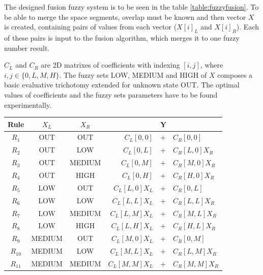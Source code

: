 The designed fusion fuzzy system is to be seen in the table \ref{table:fuzzyfusion}. To be able to merge
the space segments, overlap must be known and then vector $X$ is created, containing pairs of values
from each vector ($X[i]_L$ and $X[i]_R$). Each of these pairs is input to the fusion algorithm, which
merges it to one fuzzy number result. 

$C_{L}$ and $C_{R}$ are 2D matrixes of coefficients with indexing $[i,j]$, where $i,j \in \{0,L,M,H\}$.
The fuzzy sets LOW, MEDIUM and HIGH of $X$ composes a basic evaluative trichotomy extended for unknown state OUT.
The optimal values of coefficients and the fuzzy sets parameters have to be found experimentally. 

\begin{table}[h!]
\begin{center}
\begin{tabular}{|c|c c|rcl|} \hline
\textbf{Rule}   & \textbf{$X_L$}  & \textbf{$X_R$}  & \multicolumn{3}{|c|}{\textbf{Y}}  \\ \hline
$R_1$           & OUT             & OUT             & $C_{L}[0,0]    $&+&$ C_{R}[0,0]   $   \\ \hline
$R_2$           & OUT             & LOW             & $C_{L}[0,L]    $&+&$ C_{R}[L,0]X_R$   \\ \hline
$R_3$           & OUT             & MEDIUM          & $C_{L}[0,M]    $&+&$ C_{R}[M,0]X_R$   \\ \hline
$R_4$           & OUT             & HIGH            & $C_{L}[0,H]    $&+&$ C_{R}[H,0]X_R$   \\ \hline
$R_5$           & LOW             & OUT             & $C_{L}[L,0]X_L $&+&$ C_{R}[0,L]   $   \\ \hline
$R_6$           & LOW             & LOW             & $C_{L}[L,L]X_L $&+&$ C_{R}[L,L]X_R$   \\ \hline
$R_7$           & LOW             & MEDIUM          & $C_{L}[L,M]X_L $&+&$ C_{R}[M,L]X_R$   \\ \hline
$R_8$           & LOW             & HIGH            & $C_{L}[L,H]X_L $&+&$ C_{R}[H,L]X_R$   \\ \hline
$R_9$           & MEDIUM          & OUT             & $C_{L}[M,0]X_L $&+&$ C_{R}[0,M]$      \\ \hline
$R_{10}$        & MEDIUM          & LOW             & $C_{L}[M,L]X_L $&+&$ C_{R}[L,M]X_R$   \\ \hline
$R_{11}$        & MEDIUM          & MEDIUM          & $C_{L}[M,M]X_L $&+&$ C_{R}[M,M]X_R$   \\ \hline

\end{tabular}
\end{center}
\end{table}
